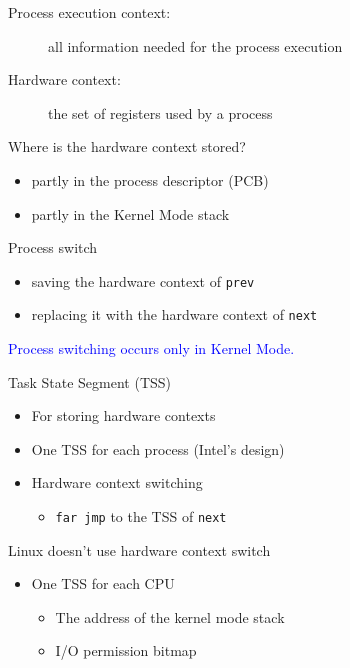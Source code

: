 \begin{frame}
  \begin{description}
  \item[Process execution context:] all information needed for the process execution
  \item[Hardware context:] the set of registers used by a process
  \end{description}
  \begin{block}{Where is the hardware context stored?}
    \begin{itemize}
    \item partly in the process descriptor (PCB)
    \item partly in the Kernel Mode stack
    \end{itemize}
  \end{block}
  \begin{block}{Process switch}
    \begin{itemize}
    \item saving the hardware context of {\texttt{prev}}
    \item replacing it with the hardware context of {\texttt{next}}
    \end{itemize}
  \end{block}
  \textcolor{blue}{Process switching occurs only in Kernel Mode.}
\end{frame}

\begin{frame}
  \begin{block}{Task State Segment (TSS)}
    \begin{itemize}
    \item For storing hardware contexts
    \item One TSS for each process (Intel's design)
    \item Hardware context switching
      \begin{itemize}
      \item {\texttt{far jmp}} to the TSS of {\texttt{next}}
      \end{itemize}
    \end{itemize}
  \end{block}
  \begin{block}{Linux doesn't use hardware context switch}
    \begin{itemize}
    \item One TSS for each CPU
      \begin{itemize}
      \item The address of the kernel mode stack
      \item I/O permission bitmap
      \end{itemize}
    \end{itemize}
  \end{block}
\end{frame}

